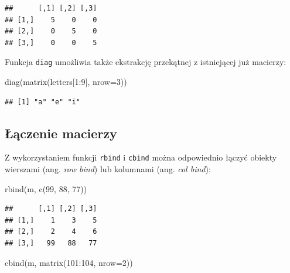\documentclass[
]{book}
\newenvironment{Shaded}{\begin{snugshade}}{\end{snugshade}}
\newcommand{\AttributeTok}[1]{\textcolor[rgb]{0.77,0.63,0.00}{#1}}
\newcommand{\DecValTok}[1]{\textcolor[rgb]{0.00,0.00,0.81}{#1}}
\newcommand{\FunctionTok}[1]{\textcolor[rgb]{0.00,0.00,0.00}{#1}}
\newcommand{\NormalTok}[1]{#1}
\newcommand{\SpecialCharTok}[1]{\textcolor[rgb]{0.00,0.00,0.00}{#1}}
\begin{document}
\begin{verbatim}
##      [,1] [,2] [,3]
## [1,]    5    0    0
## [2,]    0    5    0
## [3,]    0    0    5
\end{verbatim}

Funkcja \texttt{diag} umożliwia także ekstrakcję przekątnej z istniejącej już macierzy:

\begin{Shaded}
\begin{Highlighting}[]
\FunctionTok{diag}\NormalTok{(}\FunctionTok{matrix}\NormalTok{(letters[}\DecValTok{1}\SpecialCharTok{:}\DecValTok{9}\NormalTok{], }\AttributeTok{nrow=}\DecValTok{3}\NormalTok{))}
\end{Highlighting}
\end{Shaded}

\begin{verbatim}
## [1] "a" "e" "i"
\end{verbatim}

\hypertarget{ux142ux105czenie-macierzy}{%
\subsection{Łączenie macierzy}\label{ux142ux105czenie-macierzy}}

Z wykorzystaniem funkcji \texttt{rbind} i \texttt{cbind} można odpowiednio łączyć obiekty wierszami (ang. \emph{row bind}) lub kolumnami (ang. \emph{col bind}):

\begin{Shaded}
\begin{Highlighting}[]
\FunctionTok{rbind}\NormalTok{(m, }\FunctionTok{c}\NormalTok{(}\DecValTok{99}\NormalTok{, }\DecValTok{88}\NormalTok{, }\DecValTok{77}\NormalTok{))}
\end{Highlighting}
\end{Shaded}

\begin{verbatim}
##      [,1] [,2] [,3]
## [1,]    1    3    5
## [2,]    2    4    6
## [3,]   99   88   77
\end{verbatim}

\begin{Shaded}
\begin{Highlighting}[]
\FunctionTok{cbind}\NormalTok{(m, }\FunctionTok{matrix}\NormalTok{(}\DecValTok{101}\SpecialCharTok{:}\DecValTok{104}\NormalTok{, }\AttributeTok{nrow=}\DecValTok{2}\NormalTok{))}
\end{Highlighting}
\end{Shaded}
\end{document}
